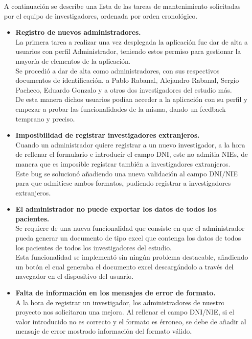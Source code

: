 A continuación se describe una lista de las tareas de mantenimiento solicitadas por el equipo de investigadores, ordenada por orden cronológico. \\
\begin{itemize}
  \item\textbf{Registro de nuevos administradores.} \\
  La primera tarea a realizar una vez desplegada la aplicación fue dar de alta a usuarios con perfil Administrador, teniendo estos permiso para gestionar la mayoría de elementos de la aplicación. \\
  \newline
  Se procedió a dar de alta como administradores, con sus respectivos documentos de identificación, a Pablo Rabanal, Alejandro Rabanal, Sergio Pacheco, Eduardo Gonzalo y a otros dos investigadores del estudio más. \\
  \newline
  De esta manera dichos usuarios podían acceder a la aplicación con su perfil y empezar a probar las funcionalidades de la misma, dando un feedback temprano y preciso.
  
  \item\textbf{Imposibilidad de registrar investigadores extranjeros.} \\
  Cuando un administrador quiere registrar a un nuevo investigador, a la hora de rellenar el formulario e introducir el campo DNI, este no admitia NIEs, de manera que es imposible registrar también a investigadores extranjeros. \\
  
  Este bug se solucionó añadiendo una nueva validación al campo DNI/NIE para que admitiese ambos formatos, pudiendo registrar a investigadores extranjeros.
  
  \item\textbf{El administrador no puede exportar los datos de todos los pacientes.} \\
  Se requiere de una nueva funcionalidad que consiste en que el administrador pueda generar un documento de tipo excel que contenga los datos de todos los pacientes de todos los investigadores del estudio. \\
  
  Esta funcionalidad se implementó sin ningún problema destacable, añadiendo un botón el cual generaba el documento excel descargándolo a través del navegador en el dispositivo del usuario.
  
   \item\textbf{Falta de información en los mensajes de error de formato.} \\
   A la hora de registrar un investigador, los administradores de nuestro proyecto nos solicitaron una mejora. Al rellenar el campo DNI/NIE, si el valor introducido no es correcto y el formato es érroneo, se debe de añadir al mensaje de error mostrado información del formato válido.
   

\end{itemize}
